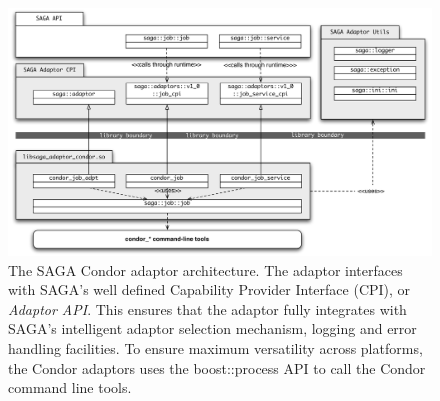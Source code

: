 \begin{figure}
  \includegraphics[width=1.0\textwidth]{./figures/condor_adaptor_arch}
  \caption{\footnotesize The SAGA Condor adaptor architecture. The adaptor interfaces
  with SAGA's well defined Capability Provider Interface (CPI), or \textit{Adaptor API}.
  This ensures that the adaptor fully integrates with SAGA's intelligent adaptor selection
  mechanism, logging and error handling facilities. To ensure maximum versatility across
  platforms, the Condor adaptors uses the boost::process API to call the Condor command 
  line tools. }
  
\label{adaptor_arch}
\end{figure}






